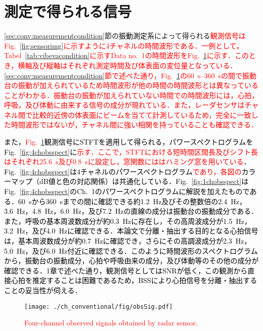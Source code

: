 \section{測定で得られる信号}
\label{sec:conv:signal}
\ref{sec:conv:measurementcondition}節の\textcolor{black}{振動測定系}によって得られる\textcolor{red}{観測信号はFig.~\ref{fig:sensorimg}に示すように4チャネルの時間波形である．一例として，Tabel~\ref{tab:vibevacondition}に示すData no.~1の時間波形をFig.~\ref{fig:obssig}に示す．このとき，横軸及び縦軸はそれぞれ測定時間及び体表面の変位量となっている．\ref{sec:conv:measurementcondition}節で述べた通り，Fig.~\ref{fig:obssig}の\textcolor{red}{60~s--360~s}の間で\textcolor{red}{振動台の振動}が加えられているため時間波形が他の時間の時間波形とは異なっていることがわかる．\textcolor{red}{振動台の振動}が加えられていない時間での時間波形には，心拍，呼吸，及び体動\textcolor{red}{に由来する信号の}成分が現れている．また，レーダセンサはチャネル間で\textcolor{red}{比較的近傍の体表面}にビームを当てて\textcolor{red}{計測}しているため，完全に一致した時間波形ではないが，チャネル間に強い相関を持っていることも確認できる．}

\textcolor{black}{また，\textcolor{red}{Fig.~\ref{fig:obssig}}観測信号にSTFTを適用して得られる，パワースペクトログラムをFig.~\ref{fig:4chobsspect}に\textcolor{red}{示す．ここで，STFTにおける短時間区間長及びシフト長はそれぞれ25.6~s及び0.8~sに設定し，窓関数にははハミング窓を用いている}．Fig.~\ref{fig:4chobsspect}は4チャネルのパワースペクトログラム\textcolor{red}{であり，各図の}カラーマップ（dB値と色の対応関係）は共通化している．Fig.~\ref{fig:1chobsspect}はFig.~\ref{fig:4chobsspect}のCh.~1のパワースペクトログラムに解説を加えたものである．60~sから360~sまでの間に確認できる約1.2~Hz及びその整数倍の2.4~Hz，3.6~Hz，4.8~Hz，6.0~Hz，及び7.2~Hzの直線の成分は振動台の振動成分である．また，呼吸の基本周波数成分が約0.3~Hzに存在し，その高周波成分が1.5~Hz，3.2~Hz，及び4.0~Hzに確認できる．本論文で分離・抽出する目的となる心拍信号は，基本周波数成分が約0.7~Hzに確認でき，さらにその高調波成分が2.3~Hz，5.0~Hz，及び6.0~Hz付近に確認できる．このように時間波形のスペクトログラムから，振動台の振動成分，心拍や呼吸由来の成分，及び体動等のその他の成分が確認できる．1章で述べた通り，観測信号としてはSNRが低く，この観測から直接心拍を推定することは困難であるため，BSSにより心拍信号を分離・抽出することの妥当性が伺える．}

\begin{figure}[b]
\centering
\texttt{[image: ./ch\_conventional/fig/obsSig.pdf]}
\caption{\textcolor{red}{Four-channel observed signals obtained by radar sensor.}}
\label{fig:obssig}
\end{figure}

